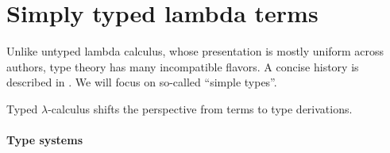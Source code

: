 \section{Simply typed lambda terms}\label{sec:simply_typed_lambda_terms}

Unlike untyped lambda calculus, whose presentation is mostly uniform across authors, type theory has many incompatible flavors. A concise history is described in . We will focus on so-called \enquote{simple types}.

Typed \( \lambda \)-calculus shifts the perspective from terms to type derivations.

\paragraph{Type systems}

